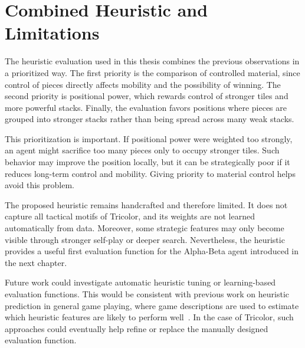 \section{Combined Heuristic and Limitations}

The heuristic evaluation used in this thesis combines the previous observations in a prioritized way. The first priority is the comparison of controlled material, since control of pieces directly affects mobility and the possibility of winning. The second priority is positional power, which rewards control of stronger tiles and more powerful stacks. Finally, the evaluation favors positions where pieces are grouped into stronger stacks rather than being spread across many weak stacks.

This prioritization is important. If positional power were weighted too strongly, an agent might sacrifice too many pieces only to occupy stronger tiles. Such behavior may improve the position locally, but it can be strategically poor if it reduces long-term control and mobility. Giving priority to material control helps avoid this problem.

The proposed heuristic remains handcrafted and therefore limited. It does not capture all tactical motifs of Tricolor, and its weights are not learned automatically from data. Moreover, some strategic features may only become visible through stronger self-play or deeper search. Nevertheless, the heuristic provides a useful first evaluation function for the Alpha-Beta agent introduced in the next chapter.

Future work could investigate automatic heuristic tuning or learning-based evaluation functions. This would be consistent with previous work on heuristic prediction in general game playing, where game descriptions are used to estimate which heuristic features are likely to perform well~\cite{stephenson2021heuristic}. In the case of Tricolor, such approaches could eventually help refine or replace the manually designed evaluation function.